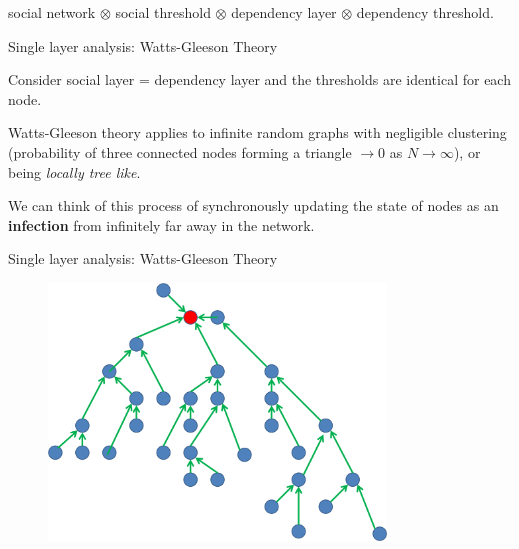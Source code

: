 \documentclass[10pt, xcolor=dvipsnames, handout]{beamer}
\begin{document}
\begin{frame}[standout]
social network $\otimes$ social threshold $\otimes$ dependency layer $\otimes$ dependency threshold.
\end{frame}

\begin{frame}{Single layer analysis: Watts-Gleeson Theory}

Consider social layer = dependency layer and the thresholds are identical for each node.

\pause Watts-Gleeson theory \cite{watts_simple_2002} \cite{gleeson_seed_2007} applies to infinite random graphs with negligible clustering (probability of three connected nodes forming a triangle $\to 0$ as $N \to \infty$), or being \emph{locally tree like}.

\pause We can think of this process of synchronously updating the state of nodes as an \textbf{infection} from infinitely far away in the network.

\end{frame}

\begin{frame}{Single layer analysis: Watts-Gleeson Theory}

\begin{figure}[htb]
\includegraphics[width=0.8\textwidth]{figures/tree.png}
\end{figure}

\end{frame}
\end{document}
